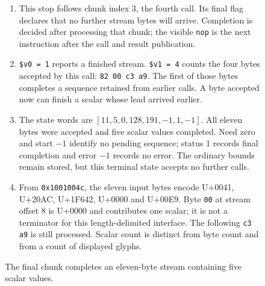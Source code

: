 \begin{figure}[htbp]
  \par\smallskip
  \begin{minipage}{\linewidth}
    \small
    \begin{enumerate}
      \setlength{\itemsep}{2pt}
            \setlength{\parsep}{0pt}
      \item This stop follows chunk index 3, the fourth call. Its final flag declares that no further stream bytes will arrive. Completion is decided after processing that chunk; the visible \texttt{nop} is the next instruction after the call and result publication.
      \item \texttt{\$v0 = 1} reports a finished stream. \texttt{\$v1 = 4} counts the four bytes accepted by this call: \texttt{82 00 c3 a9}. The first of those bytes completes a sequence retained from earlier calls. A byte accepted now can finish a scalar whose lead arrived earlier.
      \item The state words are $[11,5,0,128,191,-1,1,-1]$. All eleven bytes were accepted and five scalar values completed. Need zero and start $-1$ identify no pending sequence; status 1 records final completion and error $-1$ records no error. The ordinary bounds remain stored, but this terminal state accepts no further calls.
      \item From \texttt{0x1001004c}, the eleven input bytes encode U+0041, U+20AC, U+1F642, U+0000 and U+00E9. Byte \texttt{00} at stream offset 8 is U+0000 and contributes one scalar; it is not a terminator for this length-delimited interface. The following \texttt{c3 a9} is still processed. Scalar count is distinct from byte count and from a count of displayed glyphs.
    \end{enumerate}
  \end{minipage}
  \caption{The final chunk completes an eleven-byte stream containing five scalar values.}
  \label{capture:015-utf8-scanner-f02-finished}
  \label{utf8-f02-finished}
\end{figure}
\par
